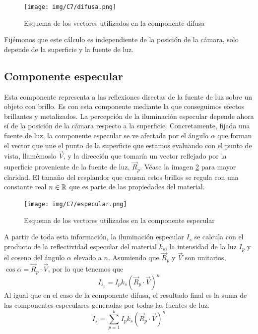 \begin{figure} [ht]
    \centering
    \texttt{[image: img/C7/difusa.png]}
    \caption{Esquema de los vectores utilizados en la componente difusa}
    \label{fig:difusa}
\end{figure}

Fijémonos que este cálculo es independiente de la posición de la cámara, solo depende de la superficie y la fuente de luz.

\subsection{Componente especular}

Esta componente representa a las reflexiones directas de la fuente de luz sobre un objeto con brillo. Es con esta componente mediante la que conseguimos efectos brillantes y metalizados. La percepción de la iluminación especular depende ahora sí de la posición de la cámara respecto a la superficie. Concretamente, fijada una fuente de luz, la componente especular se ve afectada por el ángulo $\alpha$ que forman el vector que une el punto de la superficie que estamos evaluando con el punto de vista, llamémoslo  $\vec V$, y la dirección que tomaría un vector reflejado por la superficie proveniente de la fuente de luz, $\vec R_p$. Véase la imagen \ref{fig:especular} para mayor claridad. El tamaño del resplandor que causan estos brillos se regula con una constante real $n\in\mathbb{R}$ que es parte de las propiedades del material.

\begin{figure} [ht]
    \centering
    \texttt{[image: img/C7/especular.png]}
    \caption{Esquema de los vectores utilizados en la componente especular}
    \label{fig:especular}
\end{figure}

A partir de toda esta información, la iluminación especular $I_s$ se calcula con el producto de la reflectividad especular del material $k_s$, la intensidad de la luz $I_p$ y el coseno del ángulo $\alpha$ elevado a $n$. Asumiendo que $\vec R_p$ y $\vec V$ son unitarios, $\cos\alpha=\vec R_p\cdot \vec V$, por lo que tenemos que
\begin{equation}
    I_{s_p} = I_p k_s (\vec R_p\cdot \vec V)^n
\end{equation}   
Al igual que en el caso de la componente difusa, el resultado final es la suma de las componentes especulares generadas por todas las fuentes de luz.
\begin{equation}
    I_s = \sum_{p=1}^k I_p k_s (\vec R_p \cdot \vec V)^n
\end{equation}


